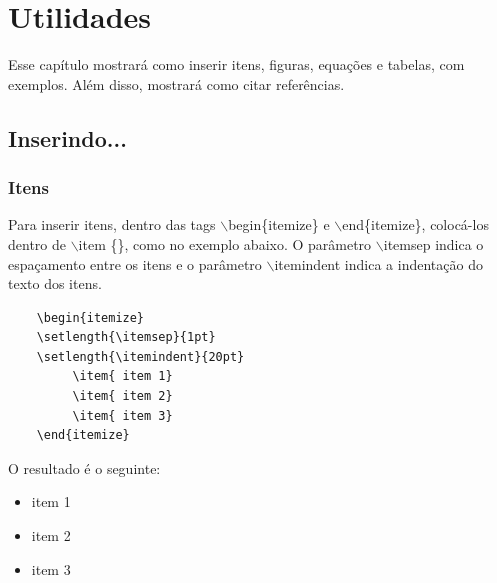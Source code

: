 


\chapter{Utilidades}\label{cap:utilidades}
Esse capítulo mostrará como inserir itens, figuras, equações e tabelas, com exemplos. Além disso, mostrará como citar referências.

\section{Inserindo...}

\subsection {Itens}
Para inserir itens, dentro das tags $\backslash$begin\{itemize\} e $\backslash$end\{itemize\}, colocá-los dentro de $\backslash$item \{\}, como no exemplo abaixo. O parâmetro $\backslash$itemsep indica o espaçamento entre os itens e o parâmetro $\backslash$itemindent indica a indentação do texto dos itens.



\begin{verbatim}
    \begin{itemize}
    \setlength{\itemsep}{1pt}
    \setlength{\itemindent}{20pt}
         \item{ item 1}
         \item{ item 2}
         \item{ item 3}
    \end{itemize}
\end{verbatim}

O resultado é o seguinte:
\begin{itemize}
\setlength{\itemsep}{1pt}
\setlength{\itemindent}{20pt}
     \item{ item 1}
     \item{ item 2}
     \item{ item 3}
\end{itemize}

